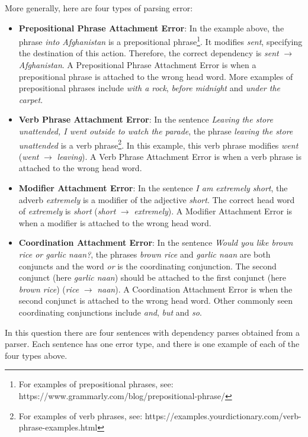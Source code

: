 \begin{parts}
    More generally, here are four types of parsing error:
    \begin{itemize}
        \item \textbf{Prepositional Phrase Attachment Error}: In the example above, the phrase \textit{into Afghanistan} is a prepositional phrase\footnote{For examples of prepositional phrases, see: https://www.grammarly.com/blog/prepositional-phrase/}. It modifies \textit{sent}, specifying the destination of this action. Therefore, the correct dependency is \textit{sent} $\rightarrow$ \textit{Afghanistan}.
        A Prepositional Phrase Attachment Error is when a prepositional phrase is attached to the wrong head word.
        More examples of prepositional phrases include \textit{with a rock}, \textit{before midnight} and \textit{under the carpet}.
        \item \textbf{Verb Phrase Attachment Error}: In the sentence \textit{Leaving the store unattended, I went outside to watch the parade}, the phrase \textit{leaving the store unattended} is a verb phrase\footnote{For examples of verb phrases, see: https://examples.yourdictionary.com/verb-phrase-examples.html}. In this example, this verb phrase modifies \textit{went} (\textit{went} $\rightarrow$ \textit{leaving}).
        A Verb Phrase Attachment Error is when a verb phrase is attached to the wrong head word.
        \item \textbf{Modifier Attachment Error}: In the sentence \textit{I am extremely short}, the adverb \textit{extremely} is a modifier of the adjective \textit{short}. The correct head word of \textit{extremely} is \textit{short} (\textit{short} $\rightarrow$ \textit{extremely}). A Modifier Attachment Error is when a modifier is attached to the wrong head word.
        \item \textbf{Coordination Attachment Error}: In the sentence \textit{Would you like brown rice or garlic naan?}, the phrases \textit{brown rice} and \textit{garlic naan} are both conjuncts and the word \textit{or} is the coordinating conjunction. The second conjunct (here \textit{garlic naan}) should be attached to the first conjunct (here \textit{brown rice}) (\textit{rice} $\rightarrow$ \textit{naan}). A Coordination Attachment Error is when the second conjunct is attached to the wrong head word. Other commonly seen coordinating conjunctions include \textit{and}, \textit{but} and \textit{so}.
    \end{itemize}
    In this question there are four sentences with dependency parses obtained from a parser. Each sentence has one error type, and there is one example of each of the four types above.

\end{parts}
